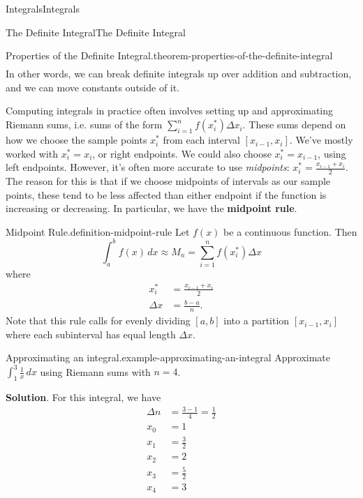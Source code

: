 \documentclass[10pt,]{book}
\newcommand{\terminology}[1]{\textbf{#1}}
\numberwithin{equation}{section}
\begin{document}
\begin{chapterptx}{Integrals}{}{Integrals}{}{}
\begin{sectionptx}{The Definite Integral}{}{The Definite Integral}{}{}
\begin{theorem}{Properties of the Definite Integral.}{}{theorem-properties-of-the-definite-integral}
\begin{align*}
\end{align*}
In other words, we can break definite integrals up over addition and subtraction, and we can move constants outside of it.%
\end{theorem}
\hypertarget{p-437}{}%
Computing integrals in practice often involves setting up and approximating Riemann sums, i.e. sums of the form \(\sum_{i=1}^{n}f(x_{i}^{*})\Delta x_{i}\). These sums depend on how we choose the sample points \(x_{i}^{*}\) from each interval \([x_{i-1},x_{i}]\). We've mostly worked with \(x_{i}^{*} = x_{i}\), or right endpoints. We could also choose \(x_{i}^{*} = x_{i-1}\), using left endpoints. However, it's often more accurate to use \emph{midpoints}: \(x_{i}^{*} = \frac{x_{i-1}+x_{i}}{2}\). The reason for this is that if we choose midpoints of intervals as our sample points, these tend to be less affected than either endpoint if the function is increasing or decreasing. In particular, we have the \terminology{midpoint rule}.%
\begin{definition}{Midpoint Rule.}{definition-midpoint-rule}%
\hypertarget{p-438}{}%
Let \(f(x)\) be a continuous function. Then%
\begin{equation*}
\int_{a}^{b}f(x)\,dx \approx M_{n} = \sum_{i=1}^{n}f(x_{i}^{*})\Delta x
\end{equation*}
where%
\begin{align*}
x_{i}^{*} & = \frac{x_{i-1}+x_{i}}{2} \\
\Delta x & = \frac{b-a}{n}. 
\end{align*}
Note that this rule calls for evenly dividing \([a,b]\) into a partition \([x_{i-1},x_{i}]\) where each subinterval has equal length \(\Delta x\).%
\end{definition}
\begin{example}{Approximating an integral.}{example-approximating-an-integral}%
\hypertarget{p-439}{}%
Approximate \(\int_{1}^{3}\frac{1}{x}\,dx\) using Riemann sums with \(n=4\).%
\par\smallskip%
\noindent\textbf{Solution}.\hypertarget{solution-96}{}\quad%
\hypertarget{p-440}{}%
For this integral, we have%
\begin{align*}
\Delta n & = \frac{3-1}{4} = \frac{1}{2} \\
x_{0} & = 1 \\
x_{1} & = \frac{3}{2} \\
x_{2} & = 2 \\
x_{3} & = \frac{5}{2} \\
x_{4} & = 3 
\end{align*}

\end{example}
\end{sectionptx}
\end{chapterptx}
\end{document}
